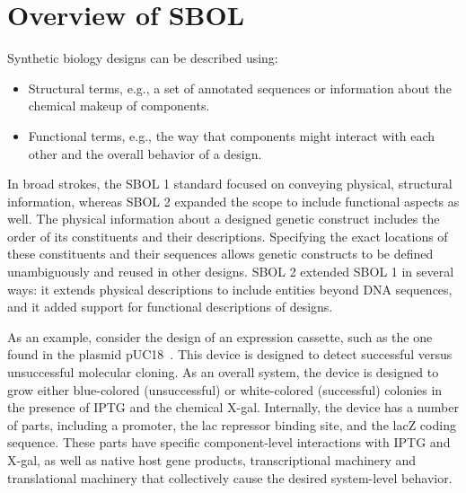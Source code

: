 \section{Overview of SBOL}

Synthetic biology designs can be described using:
\begin{itemize}
\item Structural terms, e.g., a set of annotated sequences or information about the chemical makeup of components.
\item Functional terms, e.g., the way that components might interact with each other and the overall behavior of a design.
\end{itemize}
In broad strokes, the SBOL 1 standard focused on conveying physical, structural information, whereas SBOL 2 expanded the scope to include functional aspects as well.  The physical information about a designed genetic construct includes the order of its constituents and their descriptions. Specifying the exact locations of these constituents and their sequences allows genetic constructs to be defined unambiguously and reused in other designs. SBOL 2 extended SBOL 1 in several ways: it extends physical descriptions to include entities beyond DNA sequences, and it added support for functional descriptions of designs. 

As an example, consider the design of an expression cassette, such as the one found in the plasmid pUC18~\cite{L08752.1}. This device is designed to detect successful versus unsuccessful molecular cloning.  As an overall system, the device is designed to grow either blue-colored (unsuccessful) or white-colored (successful) colonies in the presence of IPTG and the chemical X-gal. Internally, the device has a number of parts, including a promoter, the lac repressor binding site, and the lacZ coding sequence. 
These parts have specific component-level interactions with IPTG and X-gal, as well as native host gene products, transcriptional machinery and translational machinery that collectively cause the desired system-level behavior. 

